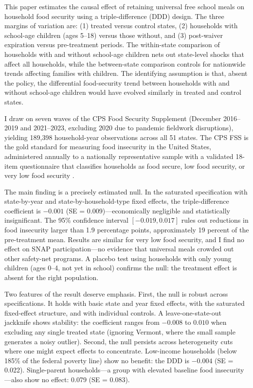 \documentclass[12pt]{article}
\begin{document}
This paper estimates the causal effect of retaining universal free school meals on household food security using a triple-difference (DDD) design. The three margins of variation are: (1) treated versus control states, (2) households with school-age children (ages 5--18) versus those without, and (3) post-waiver expiration versus pre-treatment periods. The within-state comparison of households with and without school-age children nets out state-level shocks that affect all households, while the between-state comparison controls for nationwide trends affecting families with children. The identifying assumption is that, absent the policy, the differential food-security trend between households with and without school-age children would have evolved similarly in treated and control states.

I draw on seven waves of the CPS Food Security Supplement (December 2016--2019 and 2021--2023, excluding 2020 due to pandemic fieldwork disruptions), yielding 189,398 household-year observations across all 51 states. The CPS FSS is the gold standard for measuring food insecurity in the United States, administered annually to a nationally representative sample with a validated 18-item questionnaire that classifies households as food secure, low food security, or very low food security \citep{nord2009food}.

The main finding is a precisely estimated null. In the saturated specification with state-by-year and state-by-household-type fixed effects, the triple-difference coefficient is $-0.001$ (SE = 0.009)---economically negligible and statistically insignificant. The 95\% confidence interval $[-0.019, 0.017]$ rules out reductions in food insecurity larger than 1.9 percentage points, approximately 19 percent of the pre-treatment mean. Results are similar for very low food security, and I find no effect on SNAP participation---no evidence that universal meals crowded out other safety-net programs. A placebo test using households with only young children (ages 0--4, not yet in school) confirms the null: the treatment effect is absent for the right population.

Two features of the result deserve emphasis. First, the null is robust across specifications. It holds with basic state and year fixed effects, with the saturated fixed-effect structure, and with individual controls. A leave-one-state-out jackknife shows stability: the coefficient ranges from $-0.008$ to $0.010$ when excluding any single treated state (ignoring Vermont, where the small sample generates a noisy outlier). Second, the null persists across heterogeneity cuts where one might expect effects to concentrate. Low-income households (below 185\% of the federal poverty line) show no benefit: the DDD is $-0.004$ (SE = 0.022). Single-parent households---a group with elevated baseline food insecurity---also show no effect: 0.079 (SE = 0.083).
\end{document}
